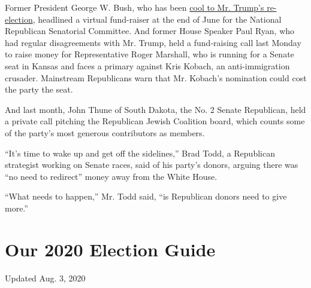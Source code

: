 Former President George W. Bush, who has been
\href{https://www.nytimes3xbfgragh.onion/2020/06/06/us/politics/trump-biden-republicans-voters.html}{cool
to Mr. Trump's re-election}, headlined a virtual fund-raiser at the end
of June for the National Republican Senatorial Committee. And former
House Speaker Paul Ryan, who had regular disagreements with Mr. Trump,
held a fund-raising call last Monday to raise money for Representative
Roger Marshall, who is running for a Senate seat in Kansas and faces a
primary against Kris Kobach, an anti-immigration crusader. Mainstream
Republicans warn that Mr. Kobach's nomination could cost the party the
seat.

And last month, John Thune of South Dakota, the No. 2 Senate Republican,
held a private call pitching the Republican Jewish Coalition board,
which counts some of the party's most generous contributors as members.

``It's time to wake up and get off the sidelines,'' Brad Todd, a
Republican strategist working on Senate races, said of his party's
donors, arguing there was ``no need to redirect'' money away from the
White House.

``What needs to happen,'' Mr. Todd said, ``is Republican donors need to
give more.''

\hypertarget{our-2020-election-guide}{%
\section{Our 2020 Election Guide}\label{our-2020-election-guide}}

Updated Aug. 3, 2020

